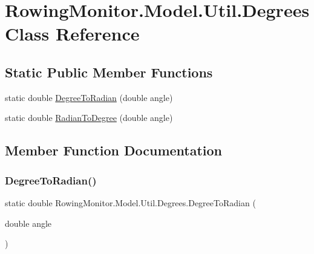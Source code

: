 \hypertarget{class_rowing_monitor_1_1_model_1_1_util_1_1_degrees}{}\section{Rowing\+Monitor.\+Model.\+Util.\+Degrees Class Reference}
\label{class_rowing_monitor_1_1_model_1_1_util_1_1_degrees}
\subsection*{Static Public Member Functions}
\begin{DoxyCompactItemize}
\item 
static double \hyperlink{class_rowing_monitor_1_1_model_1_1_util_1_1_degrees_a8d8da87b6f4f265742c46c1bca007819}{Degree\+To\+Radian} (double angle)
\item 
static double \hyperlink{class_rowing_monitor_1_1_model_1_1_util_1_1_degrees_aebe42221859cd2b97603d00bfc0e7c6c}{Radian\+To\+Degree} (double angle)
\end{DoxyCompactItemize}


\subsection{Member Function Documentation}
\mbox{\label{class_rowing_monitor_1_1_model_1_1_util_1_1_degrees_a8d8da87b6f4f265742c46c1bca007819}} 
\subsubsection{\texorpdfstring{Degree\+To\+Radian()}{DegreeToRadian()}}
{\footnotesize\ttfamily static double Rowing\+Monitor.\+Model.\+Util.\+Degrees.\+Degree\+To\+Radian (\begin{DoxyParamCaption}\item[{double}]{angle }\end{DoxyParamCaption})\hspace{0.3cm}{\ttfamily [static]}}

\mbox{\label{class_rowing_monitor_1_1_model_1_1_util_1_1_degrees_aebe42221859cd2b97603d00bfc0e7c6c}} 
